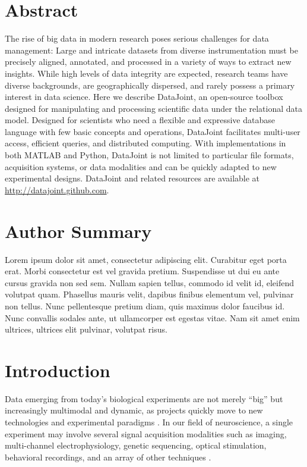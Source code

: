 \documentclass[10pt,letterpaper]{article}
\begin{document}
\section*{Abstract}
The rise of big data in modern research poses serious challenges for
data management: Large and intricate datasets from diverse
instrumentation must be precisely aligned, annotated, and processed in
a variety of ways to extract new insights.  While high levels of data
integrity are expected, research teams have diverse backgrounds, are
geographically dispersed, and rarely possess a primary interest in
data science.  Here we describe DataJoint, an open-source toolbox
designed for manipulating and processing scientific data under the
relational data model.  Designed for scientists who need a flexible
and expressive database language with few basic concepts and
operations, DataJoint facilitates multi-user access, efficient
queries, and distributed computing.  With implementations in both
MATLAB and Python, DataJoint is not limited to particular file
formats, acquisition systems, or data modalities and can be quickly
adapted to new experimental designs.  DataJoint and related resources
are available at \url{http://datajoint.github.com}.


\section*{Author Summary}
Lorem ipsum dolor sit amet, consectetur adipiscing elit. Curabitur eget porta erat. Morbi consectetur est vel gravida pretium. Suspendisse ut dui eu ante cursus gravida non sed sem. Nullam sapien tellus, commodo id velit id, eleifend volutpat quam. Phasellus mauris velit, dapibus finibus elementum vel, pulvinar non tellus. Nunc pellentesque pretium diam, quis maximus dolor faucibus id. Nunc convallis sodales ante, ut ullamcorper est egestas vitae. Nam sit amet enim ultrices, ultrices elit pulvinar, volutpat risus.

\linenumbers

\section*{Introduction}
Data emerging from today's biological experiments are not merely ``big'' but increasingly multimodal and dynamic, as projects quickly move to new technologies and experimental paradigms \cite{howe_big_2008, maze_analytical_2014, editorial_focus_2014, anderson_issues_2007, kandel_neuroscience_2013, gray_scientific_2005}.
In our field of neuroscience, a single experiment may involve several signal acquisition modalities such as imaging, multi-channel electrophysiology, genetic sequencing, optical stimulation, behavioral recordings, and an array of other techniques \cite{reimer_pupil_2014,froudarakis_population_2014}.
\end{document}
